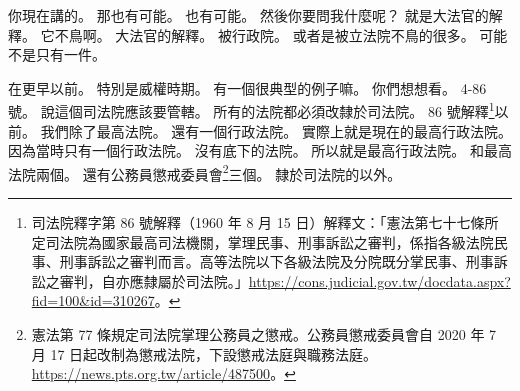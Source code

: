 \hypertarget{w01:cue:1903}{}你現在講的。
\hypertarget{w01:cue:1904}{}那也有可能。
\hypertarget{w01:cue:1905}{}也有可能。
\hypertarget{w01:cue:1906}{}然後你要問我什麼呢？
\hypertarget{w01:cue:1907}{}就是大法官的解釋。
\hypertarget{w01:cue:1908}{}它不鳥啊。
\hypertarget{w01:cue:1909}{}大法官的解釋。
\hypertarget{w01:cue:1910}{}被行政院。
\hypertarget{w01:cue:1911}{}或者是被立法院不鳥的很多。
\hypertarget{w01:cue:1912}{}可能不是只有一件。

\hypertarget{w01:cue:1913}{}在更早以前。
\hypertarget{w01:cue:1914}{}特別是威權時期。
\hypertarget{w01:cue:1915}{}有一個很典型的例子嘛。
\hypertarget{w01:cue:1916}{}你們想想看。
\hypertarget{w01:cue:1917}{}4-86 號。
\hypertarget{w01:cue:1918}{}說這個司法院應該要管轄。
\hypertarget{w01:cue:1919}{}所有的法院都必須改隸於司法院。
\hypertarget{w01:cue:1920}{}86 號解釋\footnote{司法院釋字第 86 號解釋（1960 年 8 月 15 日）解釋文：「憲法第七十七條所定司法院為國家最高司法機關，掌理民事、刑事訴訟之審判，係指各級法院民事、刑事訴訟之審判而言。高等法院以下各級法院及分院既分掌民事、刑事訴訟之審判，自亦應隸屬於司法院。」\url{https://cons.judicial.gov.tw/docdata.aspx?fid=100&id=310267}。}以前。
\hypertarget{w01:cue:1921}{}我們除了最高法院。
\hypertarget{w01:cue:1922}{}還有一個行政法院。
\hypertarget{w01:cue:1923}{}實際上就是現在的最高行政法院。
\hypertarget{w01:cue:1924}{}因為當時只有一個行政法院。
\hypertarget{w01:cue:1925}{}沒有底下的法院。
\hypertarget{w01:cue:1926}{}所以就是最高行政法院。
\hypertarget{w01:cue:1927}{}和最高法院兩個。
\hypertarget{w01:cue:1928}{}還有公務員懲戒委員會\footnote{憲法第 77 條規定司法院掌理公務員之懲戒。公務員懲戒委員會自 2020 年 7 月 17 日起改制為懲戒法院，下設懲戒法庭與職務法庭。\url{https://news.pts.org.tw/article/487500}。}三個。
\hypertarget{w01:cue:1929}{}隸於司法院的以外。
